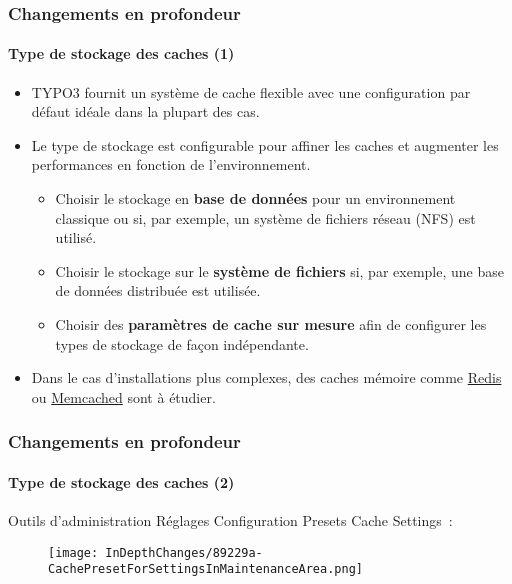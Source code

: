 \begin{frame}[fragile]
	\frametitle{Changements en profondeur}
	\framesubtitle{Type de stockage des caches (1)}

	\begin{itemize}

		\item TYPO3 fournit un système de cache flexible avec une configuration
			par défaut idéale dans la plupart des cas.
		\item Le type de stockage est configurable pour affiner les caches et
			augmenter les performances en fonction de l'environnement.

		\begin{itemize}
			\item Choisir le stockage en \textbf{base de données} pour un environnement classique
				ou si, par exemple, un système de fichiers réseau (NFS) est utilisé.
			\item Choisir le stockage sur le \textbf{système de fichiers} si, par exemple,
				une base de données distribuée est utilisée.
			\item Choisir des \textbf{paramètres de cache sur mesure} afin de configurer les types de stockage
				de façon indépendante.
		\end{itemize}

		\item Dans le cas d'installations plus complexes, des caches mémoire comme
			\href{https://redis.io/}{Redis}
			ou
			\href{https://memcached.org/}{Memcached} sont à étudier.

	\end{itemize}

\end{frame}


\begin{frame}[fragile]
	\frametitle{Changements en profondeur}
	\framesubtitle{Type de stockage des caches (2)}

	Outils d'administration \hspace{0.1cm}Réglages \hspace{0.1cm}Configuration Presets \hspace{0.1cm}Cache Settings~:

	\begin{figure}
		\texttt{[image: InDepthChanges/89229a-CachePresetForSettingsInMaintenanceArea.png]}
	\end{figure}

\end{frame}

